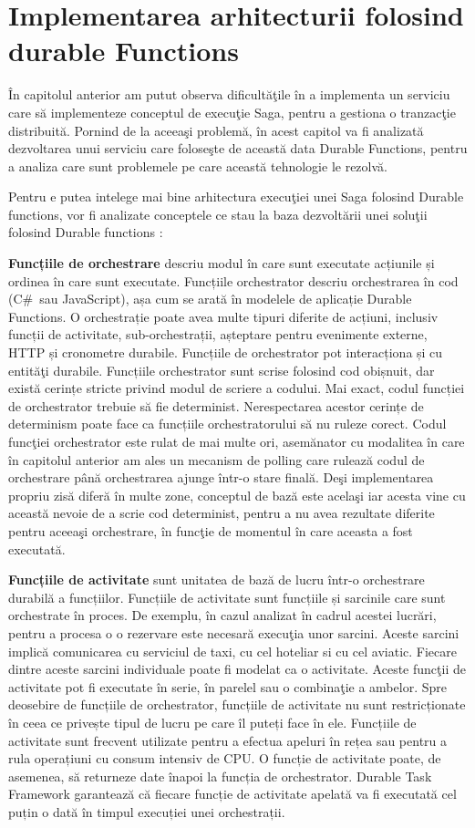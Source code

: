 \documentclass[a4paper,12pt]{report}
\begin{document}
\section{Implementarea arhitecturii folosind durable Functions}
\quad În capitolul anterior am putut observa dificultăţile în a implementa un serviciu care să implementeze conceptul de execuţie Saga, pentru a gestiona o tranzacţie distribuită. Pornind de la aceeaşi problemă, în acest capitol va fi analizată dezvoltarea unui serviciu care foloseşte de această data Durable Functions, pentru a analiza care sunt problemele pe care această tehnologie le rezolvă.
\par Pentru e putea intelege mai bine arhitectura execuţiei unei Saga folosind Durable functions, vor fi analizate conceptele ce stau la baza dezvoltării unei soluţii folosind Durable functions :
\par \textbf{Funcțiile de orchestrare} descriu modul în care sunt executate acțiunile și ordinea în care sunt executate. Funcțiile orchestrator descriu orchestrarea în cod (C\#\ sau JavaScript), așa cum se arată în modelele de aplicație Durable Functions. O orchestrație poate avea multe tipuri diferite de acțiuni, inclusiv funcții de activitate, sub-orchestrații, așteptare pentru evenimente externe, HTTP și cronometre durabile. Funcțiile de orchestrator pot interacționa și cu entităţi durabile. Funcțiile orchestrator sunt scrise folosind cod obișnuit, dar există cerințe stricte privind modul de scriere a codului. Mai exact, codul funcției de orchestrator trebuie să fie determinist. Nerespectarea acestor cerințe de determinism poate face ca funcțiile orchestratorului să nu ruleze corect. Codul funcţiei orchestrator este rulat de mai multe ori, asemănator cu modalitea în care în capitolul anterior am ales un mecanism de polling care rulează codul de orchestrare până orchestrarea ajunge într-o stare finală. Deşi implementarea propriu zisă diferă în multe zone, conceptul de bază este acelaşi iar acesta vine cu această nevoie de a scrie cod determinist, pentru a nu avea rezultate diferite pentru aceeaşi orchestrare, în funcţie de momentul în care aceasta a fost executată.
\par \textbf{Funcțiile de activitate}  sunt unitatea de bază de lucru într-o orchestrare durabilă a funcțiilor. Funcțiile de activitate sunt funcțiile și sarcinile care sunt orchestrate în proces. De exemplu, în cazul analizat în cadrul acestei lucrări, pentru a procesa o o rezervare este necesară execuţia unor sarcini. Aceste sarcini implică comunicarea cu serviciul de taxi, cu cel hoteliar si cu cel aviatic. Fiecare dintre aceste sarcini individuale poate fi modelat ca o activitate. Aceste funcţii de activitate pot fi executate în serie, în parelel sau o combinaţie a ambelor. Spre deosebire de funcțiile de orchestrator, funcțiile de activitate nu sunt restricționate în ceea ce privește tipul de lucru pe care îl puteți face în ele. Funcțiile de activitate sunt frecvent utilizate pentru a efectua apeluri în rețea sau pentru a rula operațiuni cu consum intensiv de CPU. O funcție de activitate poate, de asemenea, să returneze date înapoi la funcția de orchestrator. Durable Task Framework garantează că fiecare funcție de activitate apelată va fi executată cel puțin o dată în timpul execuției unei orchestrații.
\end{document}

